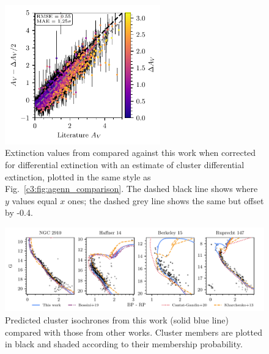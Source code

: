 \begin{figure}[t]
   \centering
   \includegraphics[width=0.6\textwidth]{fig/c3/fig_agenn_cantat_gaudin_av.pdf}
   \caption[Extinction values from \cite{cantat-gaudin_painting_2020} compared against this work when corrected for differential extinction with an estimate of cluster differential extinction]{Extinction values from \cite{cantat-gaudin_painting_2020} compared against this work when corrected for differential extinction with an estimate of cluster differential extinction, plotted in the same style as Fig.~\ref{c3:fig:agenn_comparison}. The dashed black line shows where $y$ values equal $x$ ones; the dashed grey line shows the same but offset by -0.4.}%
   \label{c3:fig:agenn_cantat_gaudin_comparison}
\end{figure}

\begin{figure}[t]
   \centering
   \includegraphics[width=\textwidth]{fig/c3/fig_agenn_fits.pdf}
   \caption[Predicted cluster isochrones from this work compared with those from other works]{Predicted cluster isochrones from this work (solid blue line) compared with those from other works. Cluster members are plotted in black and shaded according to their membership probability.}%
   \label{c3:fig:agenn_fits}
\end{figure}


